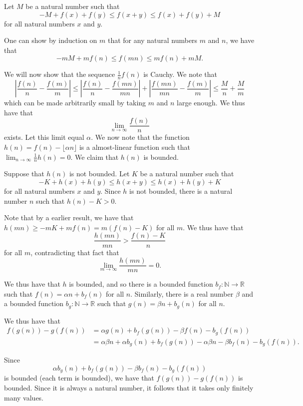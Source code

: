 \documentclass{article}
\begin{document}
\begin{enumerate}[1.]
Let $M$ be a natural number such that
\[
	-M + f(x) + f(y) \leq f(x + y) \leq f(x) + f(y) + M
\]
for all natural numbers $x$ and $y$.

One can show by induction on $m$ that for any natural numbers $m$ and $n$, we have that
\[
	-mM + mf(n) \leq f(mn) \leq mf(n) + mM.
\]

We will now show that the sequence $\frac{1}{n} f(n)$ is Cauchy. We note that
\[
	\left| \frac{f(n)}{n} - \frac{f(m)}{m} \right| \leq \left| \frac{f(n)}{n} - \frac{f(mn)}{mn} \right| + \left| \frac{f(mn)}{mn} - \frac{f(m)}{m} \right| \leq \frac{M}{n} + \frac{M}{m}
\]
which can be made arbitrarily small by taking $m$ and $n$ large enough. We thus have that
\[
	\lim_{n \to \infty} \frac{f(n)}{n}
\]
exists. Let this limit equal $\alpha$. We now note that the function $h(n) = f(n) - \lfloor \alpha n \rfloor$ is a almost-linear function such that $\lim_{n \to \infty} \frac{1}{n} h(n) = 0$. We claim that $h(n)$ is bounded.

Suppose that $h(n)$ is not bounded. Let $K$ be a natural number such that
\[
	-K + h(x) + h(y) \leq h(x + y) \leq h(x) + h(y) + K
\]
for all natural numbers $x$ and $y$. Since $h$ is not bounded, there is a natural number $n$ such that $h(n) - K > 0$.

Note that by a earlier result, we have that $h(mn) \geq -mK + mf(n) = m(f(n) - K)$ for all $m$. We thus have that
\[
	\frac{h(mn)}{mn} > \frac{f(n) - K}{n}
\]
for all $m$, contradicting that fact that
\[
	\lim_{m \to \infty} \frac{h(mn)}{mn} = 0.
\]

We thus have that $h$ is bounded, and so there is a bounded function $b_{f} : \mathbb{N} \to \mathbb{R}$ such that $f(n) = \alpha n + b_{f} (n)$ for all $n$. Similarly, there is a real number $\beta$ and a bounded function $b_{g} : \mathbb{N} \to \mathbb{R}$ such that $g(n) = \beta n + b_{g} (n)$ for all $n$.

We thus have that
\begin{align*}
	f(g(n)) - g(f(n)) &= \alpha g(n) + b_{f} (g(n)) - \beta f(n) - b_{g} (f(n)) \\
	&= \alpha \beta n + \alpha b_{g} (n) + b_{f} (g(n)) - \alpha \beta n - \beta b_{f} (n) - b_{g} (f(n)).
\end{align*}

Since 
\[
	\alpha b_{g} (n) + b_{f} (g(n)) - \beta b_{f} (n) - b_{g} (f(n))
\]
is bounded (each term is bounded), we have that $f(g(n)) - g(f(n))$ is bounded. Since it is always a natural number, it follows that it takes only finitely many values.


\end{enumerate}
\end{document}
